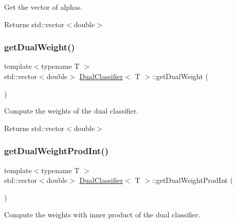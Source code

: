 Get the vector of alphas. 

\begin{DoxyReturn}{Returns}
std\+::vector$<$double$>$ 
\end{DoxyReturn}
\mbox{\label{class_dual_classifier_a179729f872fe280d752089c571187fbf}} 
\subsubsection{\texorpdfstring{get\+Dual\+Weight()}{getDualWeight()}}
{\footnotesize\ttfamily template$<$typename T $>$ \\
std\+::vector$<$double$>$ \mbox{\hyperlink{class_dual_classifier}{Dual\+Classifier}}$<$ T $>$\+::get\+Dual\+Weight (\begin{DoxyParamCaption}{ }\end{DoxyParamCaption})\hspace{0.3cm}{\ttfamily [inline]}}



Compute the weights of the dual classifier. 

\begin{DoxyReturn}{Returns}
std\+::vector$<$double$>$ 
\end{DoxyReturn}
\mbox{\label{class_dual_classifier_a2780174d195acdfc2d3c9777c48e818c}} 
\subsubsection{\texorpdfstring{get\+Dual\+Weight\+Prod\+Int()}{getDualWeightProdInt()}}
{\footnotesize\ttfamily template$<$typename T $>$ \\
std\+::vector$<$double$>$ \mbox{\hyperlink{class_dual_classifier}{Dual\+Classifier}}$<$ T $>$\+::get\+Dual\+Weight\+Prod\+Int (\begin{DoxyParamCaption}{ }\end{DoxyParamCaption})\hspace{0.3cm}{\ttfamily [inline]}}



Compute the weights with inner product of the dual classifier. 

